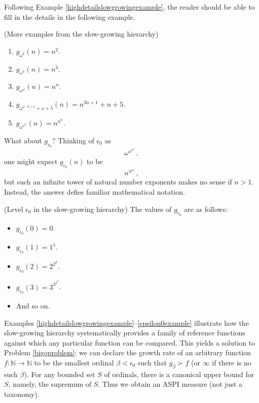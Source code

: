 \documentclass[twoside,11pt]{article}
\begin{document}
Following Example \ref{highdetailslowgrowingexample}, the reader should be able
to fill in the details in the following example.

\begin{example}
    (More examples from the slow-growing hierarchy)
    \begin{enumerate}
        \item
        $g_{\omega^2}(n)=n^2$.
        \item
        $g_{\omega^3}(n)=n^3$.
        \item
        $g_{\omega^\omega}(n)=n^n$.
        \item
        $g_{\omega^{\omega\cdot 3+1}+\omega+5}(n)=n^{3n+1}+n+5$.
        \item
        $g_{\omega^{\omega^{\omega}}}(n)=n^{n^n}$.
    \end{enumerate}
\end{example}

What about $g_{\epsilon_0}$? Thinking of $\epsilon_0$ as
\[\omega^{\omega^{\omega^{\iddots}}},\]
one might expect $g_{\epsilon_0}(n)$ to be
\[n^{n^{n^{\iddots}}},\]
but such an infinite tower
of natural number exponents makes no sense if $n>1$. Instead,
the answer defies familiar mathematical
notation.

\begin{example}
\label{epsilon0example}
(Level $\epsilon_0$ in the slow-growing hierarchy)
The values of $g_{\epsilon_0}$ are as follows:
\begin{itemize}
    \item
    $g_{\epsilon_0}(0)=0$.
    \item
    $g_{\epsilon_0}(1)=1^1$.
    \item
    $g_{\epsilon_0}(2)=2^{2^2}$.
    \item
    $g_{\epsilon_0}(3)=3^{3^{3^3}}$.
    \item
    And so on.
\end{itemize}
\end{example}

Examples \ref{highdetailslowgrowingexample}--\ref{epsilon0example} illustrate
how the slow-growing hierarchy systematically provides a family of reference
functions against which any particular function can be compared.
This yields a solution to Problem \ref{bigoproblem}: we can declare the growth
rate of an arbitrary function $f:\mathbb N\to\mathbb N$ to be the smallest ordinal
$\beta< \epsilon_0$ such that $g_\beta\succ f$ (or $\infty$ if there is no such
$\beta$).
For any bounded set $S$ of ordinals, there is a canonical upper bound for $S$,
namely, the supremum of $S$.
Thus we obtain an ASPI measure (not just a taxonomy).
\end{document}
